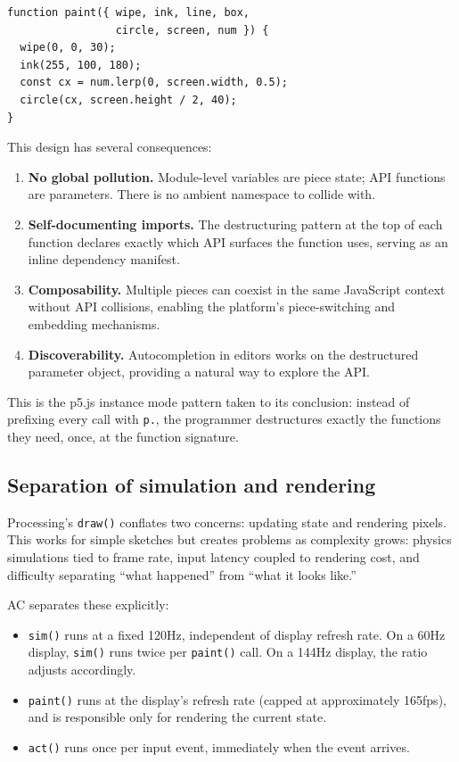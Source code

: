 \documentclass[10pt,letterpaper,twocolumn]{article}
\begin{document}
\begin{lstlisting}[style=acjsstyle,caption={API destructuring in AC.}]
function paint({ wipe, ink, line, box,
                 circle, screen, num }) {
  wipe(0, 0, 30);
  ink(255, 100, 180);
  const cx = num.lerp(0, screen.width, 0.5);
  circle(cx, screen.height / 2, 40);
}
\end{lstlisting}

This design has several consequences:

\begin{enumerate}
  \item \textbf{No global pollution.} Module-level variables are piece state; API functions are parameters. There is no ambient namespace to collide with.
  \item \textbf{Self-documenting imports.} The destructuring pattern at the top of each function declares exactly which API surfaces the function uses, serving as an inline dependency manifest.
  \item \textbf{Composability.} Multiple pieces can coexist in the same JavaScript context without API collisions, enabling the platform's piece-switching and embedding mechanisms.
  \item \textbf{Discoverability.} Autocompletion in editors works on the destructured parameter object, providing a natural way to explore the API.
\end{enumerate}

This is the p5.js instance mode pattern taken to its conclusion: instead of prefixing every call with \texttt{p.}, the programmer destructures exactly the functions they need, once, at the function signature.

\subsection{Separation of simulation and rendering}
\label{sec:simsep}

Processing's \texttt{draw()} conflates two concerns: updating state and rendering pixels. This works for simple sketches but creates problems as complexity grows: physics simulations tied to frame rate, input latency coupled to rendering cost, and difficulty separating ``what happened'' from ``what it looks like.''

AC separates these explicitly:

\begin{itemize}
  \item \texttt{sim()} runs at a fixed 120Hz, independent of display refresh rate. On a 60Hz display, \texttt{sim()} runs twice per \texttt{paint()} call. On a 144Hz display, the ratio adjusts accordingly.
  \item \texttt{paint()} runs at the display's refresh rate (capped at approximately 165fps), and is responsible only for rendering the current state.
  \item \texttt{act()} runs once per input event, immediately when the event arrives.
\end{itemize}
\end{document}

